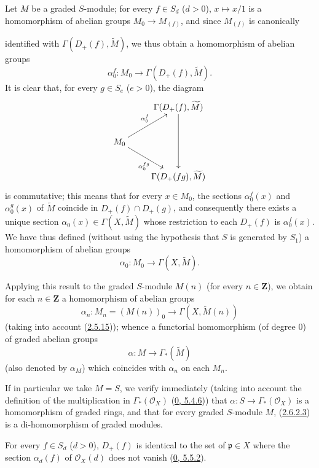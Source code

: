 \begin{env}[2.6.2]
\label{II.2.6.2}
Let $M$ be a graded $S$-module; for every $f\in S_d$ ($d>0$),
$x\mapsto x/1$ is a homomorphism of abelian groups
$M_0\to M_{(f)}$, and since $M_{(f)}$ is canonically


identified with $\Gamma(D_+(f),\widetilde{M})$, we thus obtain a
homomorphism of abelian groups
\[
  \alpha_0^f:M_0\longrightarrow\Gamma(D_+(f),\widetilde{M}).
\]
It is clear that, for every $g\in S_e$ ($e>0$), the diagram
\[
  \xymatrix{
    & \Gamma(D_+(f),\widetilde{M})\ar[dd]\\
    M_0\ar[ur]^{\alpha_0^f}\ar[dr]_{\alpha_0^{fg}}\\
    & \Gamma(D_+(fg),\widetilde{M})
  }
\]
is commutative; this means that for every $x\in M_0$, the sections
$\alpha_0^f(x)$ and $\alpha_0^g(x)$ of $\widetilde{M}$ coincide in
$D_+(f)\cap D_+(g)$, and consequently there exists a unique section
$\alpha_0(x)\in\Gamma(X,\widetilde{M})$ whose restriction to each
$D_+(f)$ is $\alpha_0^f(x)$. We have thus defined (without using the
hypothesis that $S$ is generated by $S_1$) a homomorphism of abelian groups
\[
\label{II.2.6.2.1}
  \alpha_0:M_0\longrightarrow\Gamma(X,\widetilde{M}).
\tag{2.6.2.1}
\]

Applying this result to the graded $S$-module $M(n)$ (for every
$n\in\mathbf{Z}$), we obtain for each $n\in\mathbf{Z}$ a homomorphism
of abelian groups
\[
\label{II.2.6.2.2}
  \alpha_n:M_n=(M(n))_0\longrightarrow\Gamma(X,\widetilde{M}(n))
\tag{2.6.2.2}
\]
(taking into account (\hyperref[II.2.5.15]{2.5.15})); whence a
functorial homomorphism (of degree $0$) of graded abelian groups
\[
\label{II.2.6.2.3}
  \alpha:M\longrightarrow\Gamma_*(\widetilde{M})
\tag{2.6.2.3}
\]
(also denoted by $\alpha_M$) which coincides with $\alpha_n$ on each $M_n$.

If in particular we take $M=S$, we verify immediately (taking into account
the definition of the multiplication in $\Gamma_*(\mathcal{O}_X)$
(\hyperref[0.5.4.6]{0, 5.4.6})) that
$\alpha:S\to\Gamma_*(\mathcal{O}_X)$ is a homomorphism of graded
rings, and that for every graded $S$-module $M$,
(\hyperref[II.2.6.2.3]{2.6.2.3}) is a di-homomorphism of graded
modules.
\end{env}

\begin{proposition}[2.6.3]
\label{II.2.6.3}
For every $f\in S_d$ ($d>0$), $D_+(f)$ is identical to the set of
$\mathfrak{p}\in X$ where the section $\alpha_d(f)$ of $\mathcal{O}_X(d)$
does not vanish (\hyperref[0.5.5.2]{0, 5.5.2}).
\end{proposition}

